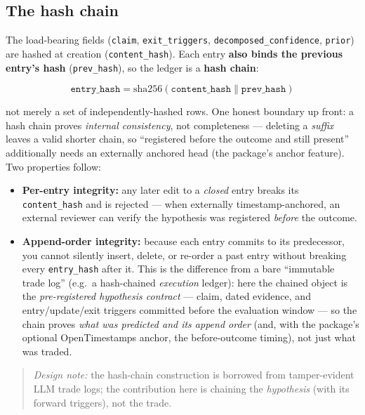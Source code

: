 \documentclass[11pt]{article}
\begin{document}
\subsection*{The hash chain}

The load-bearing fields (\texttt{claim}, \texttt{exit\_triggers},
\texttt{decomposed\_confidence}, \texttt{prior}) are hashed at creation (\texttt{content\_hash}).
Each entry \textbf{also binds the previous entry's hash} (\texttt{prev\_hash}), so the ledger is a
\textbf{hash chain}:

\[
  \texttt{entry\_hash} = \mathrm{sha256}(\texttt{content\_hash} \mathbin{\|} \texttt{prev\_hash})
\]

not merely a set of independently-hashed rows. One honest boundary up front: a hash chain
proves \emph{internal consistency}, not completeness --- deleting a \emph{suffix} leaves a valid
shorter chain, so ``registered before the outcome and still present'' additionally needs an
externally anchored head (the package's anchor feature). Two properties follow:

\begin{itemize}
  \item \textbf{Per-entry integrity:} any later edit to a \emph{closed} entry breaks its
    \texttt{content\_hash} and is rejected --- when externally timestamp-anchored, an external
    reviewer can verify the hypothesis was registered \emph{before} the outcome.
  \item \textbf{Append-order integrity:} because each entry commits to its predecessor, you cannot
    silently insert, delete, or re-order a past entry without breaking every \texttt{entry\_hash}
    after it. This is the difference from a bare ``immutable trade log'' (e.g.\ a hash-chained
    \emph{execution} ledger): here the chained object is the \emph{pre-registered hypothesis
    contract} --- claim, dated evidence, and entry/update/exit triggers committed before the
    evaluation window --- so the chain proves \emph{what was predicted and its append order} (and,
    with the package's optional OpenTimestamps anchor, the before-outcome timing), not just what
    was traded.
\end{itemize}

\begin{quote}
  \textit{Design note:} the hash-chain construction is borrowed from tamper-evident LLM trade logs;
  the contribution here is chaining the \emph{hypothesis} (with its forward triggers), not the trade.
\end{quote}
\end{document}
